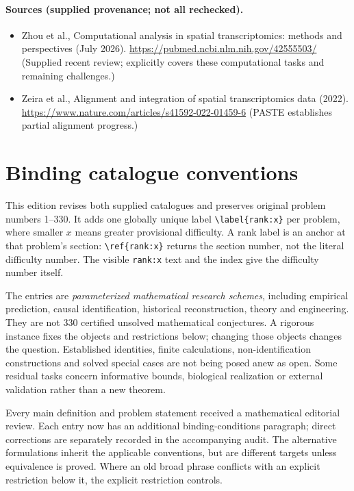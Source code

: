 \documentclass[11pt]{article}
\begin{document}
\paragraph{Sources (supplied provenance; not all rechecked).}
\begin{itemize}
\item Zhou et al., Computational analysis in spatial transcriptomics: methods and perspectives (July 2026). \url{https://pubmed.ncbi.nlm.nih.gov/42555503/} (Supplied recent review; explicitly covers these computational tasks and remaining challenges.)
\item Zeira et al., Alignment and integration of spatial transcriptomics data (2022). \url{https://www.nature.com/articles/s41592-022-01459-6} (PASTE establishes partial alignment progress.)
\end{itemize}


\section*{Binding catalogue conventions}
This edition revises both supplied catalogues and preserves original problem numbers 1--330. It adds one globally unique label \verb|\label{rank:x}| per problem, where smaller $x$ means greater provisional difficulty. A rank label is an anchor at that problem's section: \verb|\ref{rank:x}| returns the section number, not the literal difficulty number. The visible \texttt{rank:x} text and the index give the difficulty number itself.

The entries are \emph{parameterized mathematical research schemes}, including empirical prediction, causal identification, historical reconstruction, theory and engineering. They are not 330 certified unsolved mathematical conjectures. A rigorous instance fixes the objects and restrictions below; changing those objects changes the question. Established identities, finite calculations, non-identification constructions and solved special cases are not being posed anew as open. Some residual tasks concern informative bounds, biological realization or external validation rather than a new theorem.

Every main definition and problem statement received a mathematical editorial review. Each entry now has an additional binding-conditions paragraph; direct corrections are separately recorded in the accompanying audit. The alternative formulations inherit the applicable conventions, but are different targets unless equivalence is proved. Where an old broad phrase conflicts with an explicit restriction below it, the explicit restriction controls.
\end{document}
